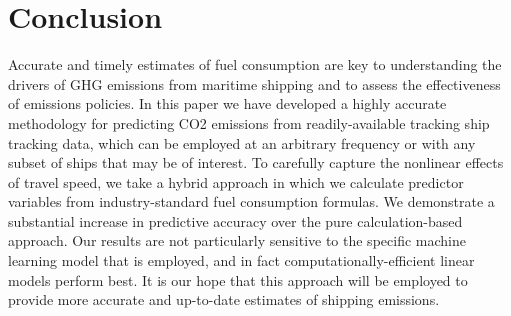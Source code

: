 \section{Conclusion}
Accurate and timely estimates of fuel consumption are key to understanding the drivers of \ac{GHG} emissions from maritime shipping and to assess the effectiveness of emissions policies. In this paper we have developed a highly accurate methodology for predicting \ac{CO2} emissions from readily-available tracking ship tracking data, which can be employed at an arbitrary frequency or with any subset of ships that may be of interest. To carefully capture the nonlinear effects of travel speed, we take a hybrid approach in which we calculate predictor variables from industry-standard fuel consumption formulas. We demonstrate a substantial increase in predictive accuracy over the pure calculation-based approach. Our results are not particularly sensitive to the specific machine learning model that is employed, and in fact computationally-efficient linear models perform best. It is our hope that this approach will be employed to provide more accurate and up-to-date estimates of shipping emissions.



% 